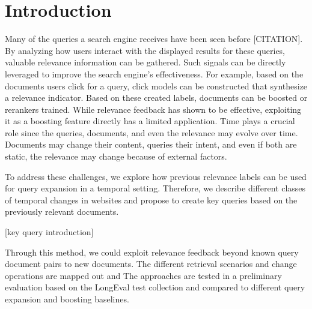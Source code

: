 \section{Introduction}

Many of the queries a search engine receives have been seen before {\color{red}[CITATION]}. By analyzing how users interact with the displayed results for these queries, valuable relevance information can be gathered. Such signals can be directly leveraged to improve the search engine's effectiveness. For example, based on the documents users click for a query, click models can be constructed that synthesize a relevance indicator. Based on these created labels, documents can be boosted or rerankers trained. While relevance feedback has shown to be effective, exploiting it as a boosting feature directly has a limited application. Time plays a crucial role since the queries, documents, and even the relevance may evolve over time. Documents may change their content, queries their intent, and even if both are static, the relevance may change because of external factors.

To address these challenges, we explore how previous relevance labels can be used for query expansion in a temporal setting. Therefore, we describe different classes of temporal changes in websites and propose to create key queries based on the previously relevant documents.

{\color{red}[key query introduction]}

Through this method, we could exploit relevance feedback beyond known query document pairs to new documents. 
The different retrieval scenarios and change operations are mapped out and 
The approaches are tested in a preliminary evaluation based on the LongEval test collection and compared to different query expansion and boosting baselines.



